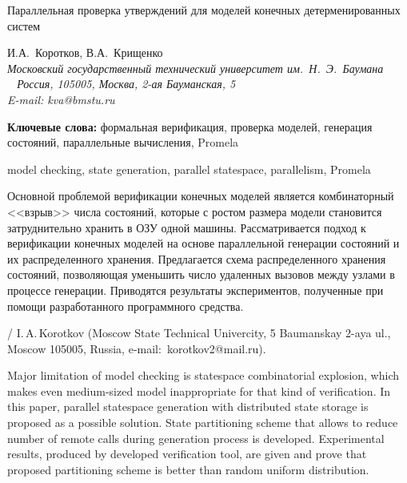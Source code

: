 \documentclass[12pt,a4paper,fleqn]{article}
\begin{document}
\begin{center}
\huge Параллельная проверка утверждений для моделей конечных детерменированных систем
\end{center}

\vspace{5mm}

\begin{center}
И.А.~Коротков, В.А.~Крищенко\\
\it Московский государственный технический университет им.~Н.~Э.~Баумана\\\
\rm
Россия, 105005, Москва, 2-ая Бауманская, 5\\
E-mail: kva@bmstu.ru

\hspace{1.25cm}

\vspace{8mm}

\begin{minipage}{12.16cm}\noindent

\footnotesize{\bf Ключевые слова:} формальная верификация, проверка моделей, генерация состояний, параллельные
вычисления, Promela

 model checking, state generation, parallel statespace, parallelism, Promela

\vspace{6mm}

\noindent Основной проблемой верификации конечных моделей является комбинаторный <<взрыв>> числа состояний, которые с
ростом размера модели становится затруднительно хранить в ОЗУ одной машины. Рассматривается подход к верификации
конечных моделей на основе параллельной генерации состояний и их распределенного хранения. Предлагается схема
распределенного хранения состояний, позволяющая уменьшить число удаленных вызовов между узлами в процессе
генерации. Приводятся результаты экспериментов, полученные при помощи разработанного программного средства.

\vspace{4mm}

 /
I.\,A.\,Korotkov (Moscow State Technical Univercity, 5 Baumanskay 2-aya ul., Moscow 105005, Russia,
e-mail:~korotkov2@mail.ru).

Major limitation of model checking is statespace combinatorial explosion, which makes even medium-sized model
inappropriate for that kind of verification. In this paper, parallel statespace generation with distributed state
storage is proposed as a possible solution. State partitioning scheme that allows to reduce number of remote calls
during generation process is developed.  Experimental results, produced by developed verification tool, are given and
prove that proposed partitioning scheme is better than random uniform distribution.
\end{minipage}

\end{center}
\end{document}
